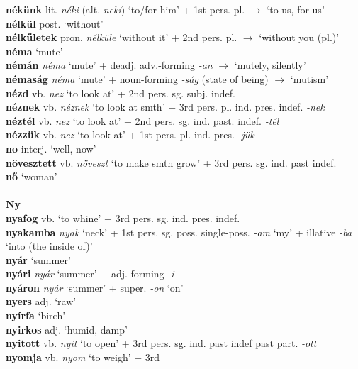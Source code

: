 \documentclass[11pt]{article}
\begin{document}
\textbf{nékünk} lit. \emph{néki} (alt. \emph{neki}) `to/for him' +
1st pers. pl. $\rightarrow$ `to us, for us' \\
\textbf{nélkül} post. `without' \\
\textbf{nélkűletek} pron. \emph{nélküle} `without it' + 2nd
pers. pl. $\rightarrow$ `without you (pl.)' \\
\textbf{néma} `mute' \\
\textbf{némán} \emph{néma} `mute' +
deadj. adv.\hyp{}forming \emph{-an} $\rightarrow$ `mutely, silently' \\
\textbf{némaság} \emph{néma} `mute' + noun\hyp{}forming \emph{-ság}
(state of being) $\rightarrow$ `mutism' \\
\textbf{nézd} vb. \emph{nez} `to look at' + 2nd
pers. sg. subj. indef. \\
\textbf{néznek} vb. \emph{néznek} `to look at smth' + 3rd
  pers. pl. ind. pres. indef. \emph{-nek} \\
\textbf{néztél} vb. \emph{nez} `to look at' + 2nd
pers. sg. ind. past. indef. \emph{-tél} \\
\textbf{nézzük} vb. \emph{nez} `to look at' + 1st
pers. pl. ind. pres. \emph{-jük} \\
\textbf{no} interj. `well, now' \\
\textbf{növesztett} vb. \emph{növeszt} `to make smth grow' + 3rd
pers. sg. ind. past indef. \\
\textbf{nő} `woman' \\
\ \\
\noindent \textbf{\large Ny} \\
\textbf{nyafog} vb. `to whine' + 3rd pers. sg. ind. pres. indef. \\
\textbf{nyakamba} \emph{nyak} `neck' + 1st
pers. sg. poss. single\hyp{}poss. \emph{-am} `my' +
illative \emph{-ba} `into (the inside of)' \\
\textbf{nyár} `summer' \\
\textbf{nyári} \emph{nyár} `summer' + adj.\hyp{}forming \emph{-i} \\
\textbf{nyáron} \emph{nyár} `summer' + super. \emph{-on} `on' \\
\textbf{nyers} adj. `raw' \\
\textbf{nyírfa} `birch' \\
\textbf{nyirkos} adj. `humid, damp' \\
\textbf{nyitott} vb. \emph{nyit} `to open' + 3rd pers. sg. ind. past
indef \textbar\textbar{} past part. \emph{-ott} \\
\textbf{nyomja} vb. \emph{nyom} `to weigh' + 3rd
\end{document}
